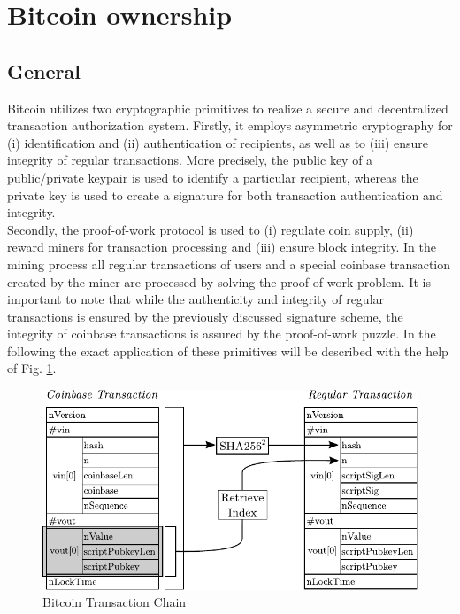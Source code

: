 \section{Bitcoin ownership} \label{sec:BitcoinOwnership}

\subsection{General} \label{sec:OwnershipGeneral}
Bitcoin utilizes two cryptographic primitives to realize a secure and decentralized transaction authorization system. Firstly, it employs asymmetric cryptography for (i) identification and (ii) authentication of recipients, as well as to (iii) ensure integrity of regular transactions. More precisely, the public key of a public/private keypair is used to identify a particular recipient, whereas the private key is used to create a signature for both transaction authentication and integrity.~\\

\noindent
Secondly, the proof-of-work protocol is used to (i) regulate coin supply, (ii) reward miners for transaction processing and (iii) ensure block integrity. In the mining process all regular transactions of users and a special coinbase transaction created by the miner are processed by solving the proof-of-work problem. It is important to note that while the authenticity and integrity of regular transactions is ensured by the previously discussed signature scheme, the integrity of coinbase transactions is assured by the proof-of-work puzzle. In the following the exact application of these primitives will be described with the help of Fig. \ref{fig:TransactionChain}.

\vspace{-10pt}
\begin{figure}[htbp]
\centering
\includegraphics[scale=0.9]{images/Ownership.pdf}

\caption{Bitcoin Transaction Chain}
\label{fig:TransactionChain}
\end{figure}
\vspace{-10pt}

